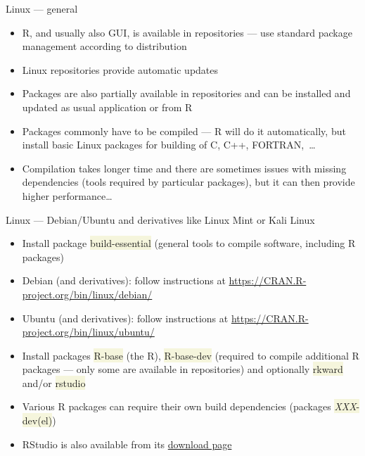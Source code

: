 \documentclass[compress, xelatex, 11pt, xcolor=svgnames, aspectratio=169,
	hyperref={
		bookmarks=true,
		unicode=true,
		colorlinks=true,
		pdftitle={Molecular data in R},
		plainpages=false,
		pdfauthor={Vojtech Zeisek},
		pdfsubject={Course about phylogeny and evolution in R},
		pdfcreator={XeLaTeX},
		pdfkeywords={R, evolution, phylogeny, molecular data},
		linkcolor=Crimson, %
		anchorcolor=Magenta, %
		citecolor=Magenta, %
		filecolor=Magenta, %
		menucolor=Magenta, %
		urlcolor=DodgerBlue, %
		},
	url={hyphens, lowtilde} %
	]{beamer}
\renewcommand{\texttt}[1]{\colorbox{Beige}{{\ttfamily #1}}}
\begin{document}
\begin{frame}{Linux --- general}
	\begin{itemize}
		\item R, and usually also GUI, is available in repositories --- use standard package management according to distribution
		\item Linux repositories provide automatic updates
		\item Packages are also partially available in repositories and can be installed and updated as usual application or from R
		\item Packages commonly have to be compiled --- R will do it automatically, but install basic Linux packages for building of C, C++, FORTRAN,~\ldots
		\item Compilation takes longer time and there are sometimes issues with missing dependencies (tools required by particular packages), but it can then provide higher performance\ldots
	\end{itemize}
\end{frame}

\begin{frame}{Linux --- Debian/Ubuntu and derivatives like Linux Mint or Kali Linux}
	\begin{itemize}
		\item Install package \texttt{build-essential} (general tools to compile software, including R packages)
		\item Debian (and derivatives): follow instructions at \url{https://CRAN.R-project.org/bin/linux/debian/}
		\item Ubuntu (and derivatives): follow instructions at \url{https://CRAN.R-project.org/bin/linux/ubuntu/}
		\item Install packages \texttt{R-base} (the R), \texttt{R-base-dev} (required to compile additional R packages --- only some are available in repositories) and optionally \texttt{rkward} and/or \texttt{rstudio}
		\item Various R packages can require their own build dependencies (packages \texttt{\textit{XXX}-dev(el)})
		\item RStudio is also available from its \href{https://posit.co/products/open-source/rstudio/download/}{download page}
	\end{itemize}
\end{frame}
\end{document}
